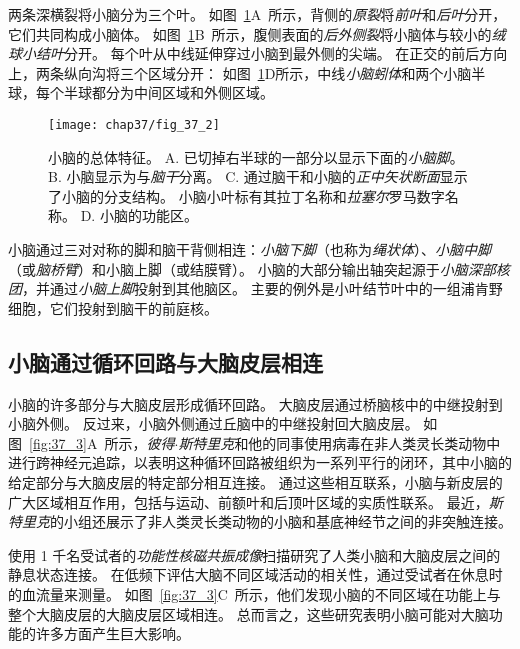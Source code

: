 两条深横裂将小脑分为三个叶。
如图~\ref{fig:37_2}A~所示，背侧的\textit{原裂}将\textit{前叶}和\textit{后叶}分开，它们共同构成小脑体。
如图~\ref{fig:37_2}B~所示，腹侧表面的\textit{后外侧裂}将小脑体与较小的\textit{绒球小结叶}分开。
每个叶从中线延伸穿过小脑到最外侧的尖端。
在正交的前后方向上，两条纵向沟将三个区域分开：
如图~\ref{fig:37_2}D所示，中线\textit{小脑蚓体}和两个小脑半球，每个半球都分为中间区域和外侧区域。


\begin{figure}[htbp]
	\centering
	\texttt{[image: chap37/fig\_37\_2]}
	\caption{小脑的总体特征\cite{nieuwenhuys2007human}。
		A. 已切掉右半球的一部分以显示下面的\textit{小脑脚}。
		B. 小脑显示为与\textit{脑干}分离。
		C. 通过脑干和小脑的\textit{正中矢状断面}显示了小脑的分支结构。
		小脑小叶标有其拉丁名称和\textit{拉塞尔}罗马数字名称\cite{larsell1972comparative}。
		D. 小脑的功能区。}
	\label{fig:37_2}
\end{figure}


小脑通过三对对称的脚和脑干背侧相连：\textit{小脑下脚}（也称为\textit{绳状体}）、\textit{小脑中脚}（或\textit{脑桥臂}）和小脑上脚（或结膜臂）。
小脑的大部分输出轴突起源于\textit{小脑深部核团}，并通过\textit{小脑上脚}投射到其他脑区。
主要的例外是小叶结节叶中的一组浦肯野细胞，它们投射到脑干的前庭核。



\subsection{小脑通过循环回路与大脑皮层相连}

小脑的许多部分与大脑皮层形成循环回路。
大脑皮层通过桥脑核中的中继投射到小脑外侧。
反过来，小脑外侧通过丘脑中的中继投射回大脑皮层。
如图~\ref{fig:37_3}A~所示，\textit{彼得$\cdot$斯特里克}和他的同事使用病毒在非人类灵长类动物中进行跨神经元追踪，以表明这种循环回路被组织为一系列平行的闭环，其中小脑的给定部分与大脑皮层的特定部分相互连接。
通过这些相互联系，小脑与新皮层的广大区域相互作用，包括与运动、前额叶和后顶叶区域的实质性联系。
最近，\textit{斯特里克}的小组还展示了非人类灵长类动物的小脑和基底神经节之间的非突触连接。


使用 1 千名受试者的\textit{功能性核磁共振成像}扫描研究了人类小脑和大脑皮层之间的静息状态连接。
在低频下评估大脑不同区域活动的相关性，通过受试者在休息时的血流量来测量。
如图~\ref{fig:37_3}C~所示，他们发现小脑的不同区域在功能上与整个大脑皮层的大脑皮层区域相连。
总而言之，这些研究表明小脑可能对大脑功能的许多方面产生巨大影响。


